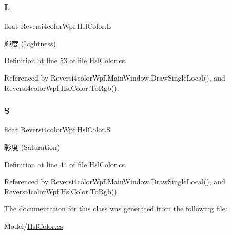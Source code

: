\subsubsection{\texorpdfstring{L}{L}}
{\footnotesize\ttfamily float Reversi4color\+Wpf.\+Hsl\+Color.\+L\hspace{0.3cm}{\ttfamily [get]}}



輝度 (Lightness) 



Definition at line 53 of file Hsl\+Color.\+cs.



Referenced by Reversi4color\+Wpf.\+Main\+Window.\+Draw\+Single\+Local(), and Reversi4color\+Wpf.\+Hsl\+Color.\+To\+Rgb().

\mbox{\label{class_reversi4color_wpf_1_1_hsl_color_add0e2fa688031f37fba1108a6c6cbd2d}} 
\subsubsection{\texorpdfstring{S}{S}}
{\footnotesize\ttfamily float Reversi4color\+Wpf.\+Hsl\+Color.\+S\hspace{0.3cm}{\ttfamily [get]}}



彩度 (Saturation) 



Definition at line 44 of file Hsl\+Color.\+cs.



Referenced by Reversi4color\+Wpf.\+Main\+Window.\+Draw\+Single\+Local(), and Reversi4color\+Wpf.\+Hsl\+Color.\+To\+Rgb().



The documentation for this class was generated from the following file\+:\begin{DoxyCompactItemize}
\item 
Model/\hyperlink{_hsl_color_8cs}{Hsl\+Color.\+cs}\end{DoxyCompactItemize}

